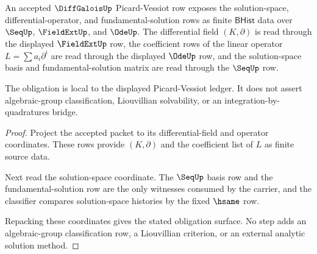 \begin{theorem}
\label{thm:diffgalois-picard-vessiot-obligation}
An accepted $\DiffGaloisUp$ Picard-Vessiot row exposes the solution-space,
differential-operator, and fundamental-solution rows as finite
$\mathsf{BHist}$ data over $\SeqUp$, $\FieldExtUp$, and $\OdeUp$. The
differential field $(K,\partial)$ is read through the displayed
$\FieldExtUp$ row, the coefficient rows of the linear operator
$L=\sum a_i\partial^i$ are read through the displayed $\OdeUp$ row, and the
solution-space basis and fundamental-solution matrix are read through the
$\SeqUp$ row.

The obligation is local to the displayed Picard-Vessiot ledger. It does not
assert algebraic-group classification, Liouvillian solvability, or an
integration-by-quadratures bridge.
\end{theorem}
\begin{proof}
Project the accepted packet to its differential-field and operator
coordinates. These rows provide $(K,\partial)$ and the coefficient list of
$L$ as finite source data.

Next read the solution-space coordinate. The $\SeqUp$ basis row and the
fundamental-solution row are the only witnesses consumed by the carrier, and
the classifier compares solution-space histories by the fixed $\hsame$ row.

Repacking these coordinates gives the stated obligation surface. No step adds
an algebraic-group classification row, a Liouvillian criterion, or an external
analytic solution method.
\end{proof}

